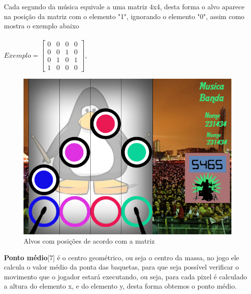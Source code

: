 \documentclass{sciposter}
\begin{document}
\begin{multicols}{3}
Cada segundo da música equivale a uma matriz 4x4, desta forma o alvo aparece na posição da matriz com o elemento "1", ignorando o elemento "0", assim como mostra o exemplo abaixo
\\
\\

$ Exemplo =\left[\begin{array}{rrrr}
0 & 0 & 0 & 0\\
0 & 0 & 1 & 0\\
0 & 1 & 0 & 1\\
1 & 0 & 0 & 0
\end{array}\right],\quad$

\begin{figure}[!htb]
\includegraphics[width=20cm]{Exemple.png}
\caption{Alvos com posições de acordo com a matriz}
\label{alvos}
\end{figure}


\textbf{Ponto médio}[7] é o centro geométrico, ou seja o centro da massa, no jogo ele calcula o valor médio da ponta das baquetas, para que seja possível verificar o movimento que o jogador estará executando, ou seja, para cada pixel é calculado a altura do elemento x, e do elemento y, desta forma obtemos o ponto médio.


\end{multicols}
\end{document}

